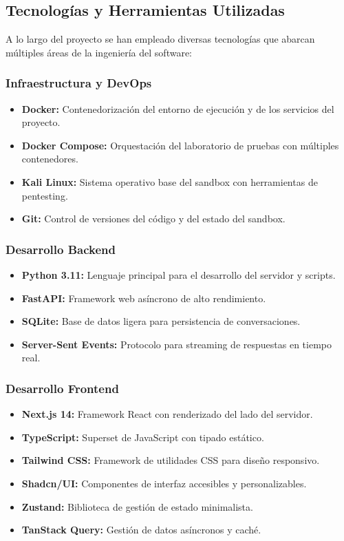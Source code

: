 \documentclass[12pt,a4paper]{article}
\begin{document}
\newpage

\subsection{Tecnologías y Herramientas Utilizadas}

A lo largo del proyecto se han empleado diversas tecnologías que abarcan múltiples áreas de la ingeniería del software:

\subsubsection{Infraestructura y DevOps}

\begin{itemize}
    \item \textbf{Docker:} Contenedorización del entorno de ejecución y de los servicios del proyecto.
    \item \textbf{Docker Compose:} Orquestación del laboratorio de pruebas con múltiples contenedores.
    \item \textbf{Kali Linux:} Sistema operativo base del sandbox con herramientas de pentesting.
    \item \textbf{Git:} Control de versiones del código y del estado del sandbox.
\end{itemize}

\subsubsection{Desarrollo Backend}

\begin{itemize}
    \item \textbf{Python 3.11:} Lenguaje principal para el desarrollo del servidor y scripts.
    \item \textbf{FastAPI:} Framework web asíncrono de alto rendimiento.
    \item \textbf{SQLite:} Base de datos ligera para persistencia de conversaciones.
    \item \textbf{Server-Sent Events:} Protocolo para streaming de respuestas en tiempo real.
\end{itemize}

\subsubsection{Desarrollo Frontend}

\begin{itemize}
    \item \textbf{Next.js 14:} Framework React con renderizado del lado del servidor.
    \item \textbf{TypeScript:} Superset de JavaScript con tipado estático.
    \item \textbf{Tailwind CSS:} Framework de utilidades CSS para diseño responsivo.
    \item \textbf{Shadcn/UI:} Componentes de interfaz accesibles y personalizables.
    \item \textbf{Zustand:} Biblioteca de gestión de estado minimalista.
    \item \textbf{TanStack Query:} Gestión de datos asíncronos y caché.
\end{itemize}
\end{document}
